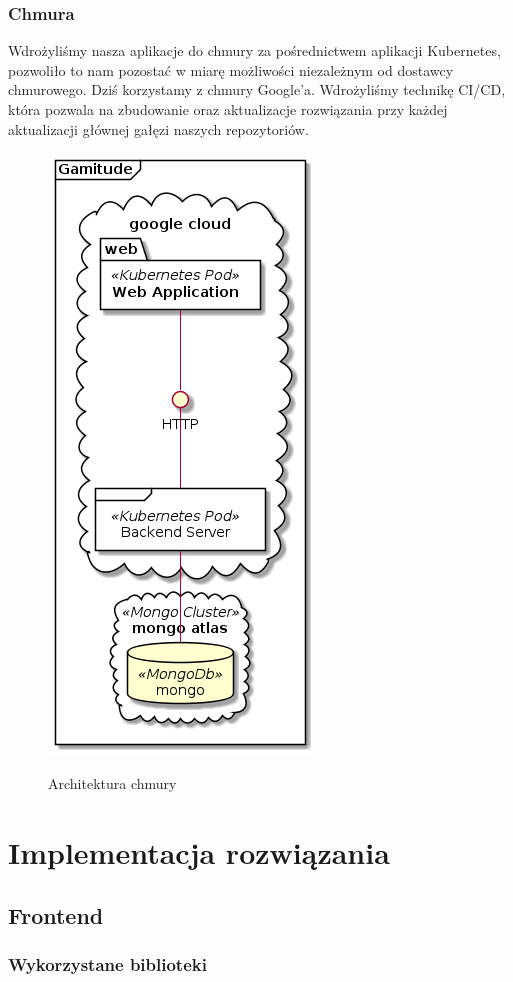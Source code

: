 \documentclass[a4paper,11pt]{report}
\begin{document}
\subsection{Chmura}
Wdrożyliśmy nasza aplikacje do chmury za pośrednictwem aplikacji Kubernetes, pozwoliło to nam pozostać w miarę możliwości
niezależnym od dostawcy chmurowego. Dziś korzystamy z chmury Google'a.
Wdrożyliśmy technikę CI/CD, która pozwala na zbudowanie oraz aktualizacje rozwiązania przy każdej aktualizacji głównej gałęzi naszych repozytoriów.
\begin{figure}[h]
	\centering
	\includegraphics[scale=0.5]{gamitude_cloud_overview}\\
	\caption{Architektura chmury}
	\label{fig:db}
\end{figure}
\chapter {Implementacja rozwiązania}
\section{Frontend}
\subsection{Wykorzystane biblioteki}
\end{document}
